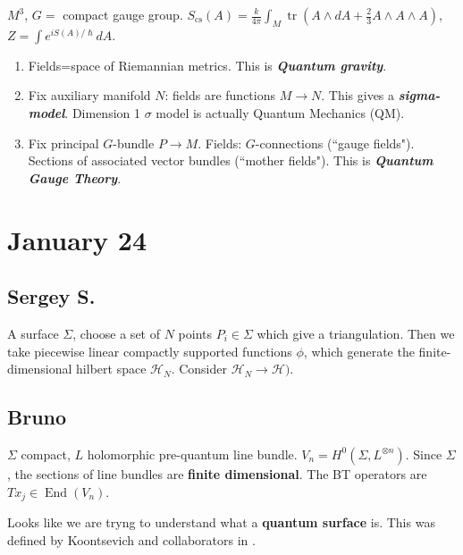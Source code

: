 \begin{example}\leavevmode
\(M^3\), \(G=\) compact gauge group. \(S_{\operatorname{cs}}(A)=\frac{k}{4\pi}
\int_M \operatorname{tr}(A \wedge dA+\frac{2}{3}A \wedge A \wedge A)\), \(Z=
\int e^{i S(A)/\hslash}dA\).
\end{example}

\begin{example}\leavevmode
\begin{enumerate}[label=(\alph*)]
\item Fields=space of Riemannian metrics. This is \textit{\textbf{Quantum
gravity}}.
\item Fix auxiliary manifold $N$: fields are functions \(M \to N\). This gives a
\textit{\textbf{sigma-model}}. Dimension 1 \(\sigma\) model is actually Quantum
Mechanics (QM).
\item Fix principal \(G\)-bundle \(P \to M\). Fields: \(G\)-connections (``gauge
fields"). Sections of associated vector bundles (``mother fields"). This is
\textit{\textbf{Quantum Gauge Theory}}.
\end{enumerate}
\end{example}

\section{January 24}

\subsection{Sergey S.}

A surface \(\Sigma\), choose a set of \(N\) points \(P_i \in \Sigma\) which give
a triangulation. Then we take piecewise linear compactly supported functions
\(\phi\), which generate the finite-dimensional hilbert space \(\mathcal{H}_N\).
Consider \(\mathcal{H}_N \to \mathcal{H})\).

\subsection{Bruno}

\(\Sigma\) compact, \(L\) holomorphic pre-quantum line bundle.
\(V_n=H^{0}(\Sigma,L^{\otimes n})\). Since \(\Sigma\), the sections of line
bundles are \textbf{finite dimensional}. The BT operators are \(Tx_j \in
\operatorname{End}(V_n)\).

Looks like we are tryng to understand what a \textbf{quantum surface} is. This
was defined by Koontsevich and collaborators in \cite{kon}.

